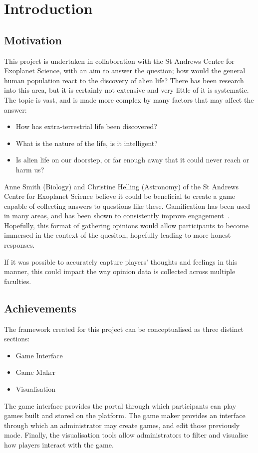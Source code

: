 \chapter{Introduction}

\section{Motivation}
This project is undertaken in collaboration with the St Andrews Centre for Exoplanet Science, with an aim to answer the question; how would the general human population react to the discovery of alien life?
There has been research~\cite{ReactionsToMessage, HowReactDiscovery, Fear} into this area, but it is certainly not extensive and very little of it is systematic. The topic is vast, and is made more complex by many factors that may affect the answer:
\begin{itemize}
    \item How has extra-terrestrial life been discovered?
    \item What is the nature of the life, is it intelligent?
    \item Is alien life on our doorstep, or far enough away that it could never reach or harm us?
\end{itemize}
Anne Smith (Biology) and Christine Helling (Astronomy) of the St Andrews Centre for Exoplanet Science believe it could be beneficial to create a game capable of collecting answers to questions like these. Gamification has been used in many areas, and has been shown to consistently improve engagement~\cite{engage}. Hopefully, this format of gathering opinions would allow participants to become immersed in the context of the quesiton, hopefully leading to more honest responses. 

If it was possible to accurately capture players' thoughts and feelings in this manner, this could impact the way opinion data is collected across multiple faculties.

\section{Achievements}
The framework created for this project can be conceptualised as three distinct sections:
\begin{itemize}
    \item Game Interface
    \item Game Maker
    \item Visualisation
\end{itemize}
The game interface provides the portal through which participants can play games built and stored on the platform. The game maker provides an interface through which an administrator may create games, and edit those previously made. Finally, the visualisation tools allow administrators to filter and visualise how players interact with the game.

